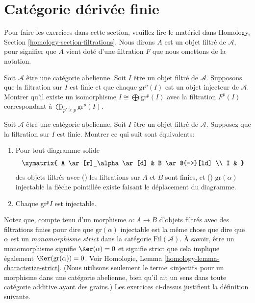 \section{Catégorie dérivée finie}
\label{section-filtered-derived}

\noindent
Pour faire les exercices dans cette section, veuillez lire le
matériel dans Homology, Section \ref{homology-section-filtrations}. Nous dirons $A$ est un
objet filtré de $\mathcal{A}$, pour signifier que $A$ vient doté d'une
filtration $F$ que nous omettons de la notation.

\begin{exercise}
\label{exercise-split-injective}
Soit $\mathcal{A}$ être une catégorie abelienne.
Soit $I$ être un objet filtré de
$\mathcal{A}$. Supposons que la filtration sur
$I$ est finie et que chaque $\text{gr}^p(I)$ est un objet
injecteur de $\mathcal{A}$. Montrer qu'il
existe un isomorphisme $I \cong \bigoplus \text{gr}^p(I)$ avec
la filtration $F^p(I)$ correspondant à $\bigoplus_{p' \geq p} \text{gr}^p(I)$.
\end{exercise}

\begin{exercise}
\label{exercise-filtered-injective}
Soit $\mathcal{A}$ être une catégorie abelienne. Soit
$I$ être un objet filtré de $\mathcal{A}$. Supposez
que la filtration sur $I$ est finie.
Montrer ce qui suit sont équivalents:
\begin{enumerate}
\item Pour tout diagramme solide
$$
\xymatrix{
A \ar[r]_\alpha \ar[d] & B \ar@{-->}[ld] \\
I &
}
$$
des objets filtrés
avec () les filtrations sur $A$ et $B$ sont
finies, et () $\text{gr}(\alpha)$ injectable la flèche
pointillée existe faisant le déplacement du diagramme.
\item Chaque $\text{gr}^p I$ est injectable.
\end{enumerate}
\end{exercise}

\noindent
Notez que, compte tenu d'un morphisme $\alpha : A \to
B$ d'objets filtrés avec des filtrations finies pour dire que
$\text{gr}(\alpha)$ injectable est la même chose que dire que $\alpha$ est
un {\it monomorphisme strict} dans la catégorie
$\text{Fil}(\mathcal{A})$. À savoir, être un monomorphisme signifie $\Ker(\alpha) = 0$
et signifie strict que cela implique également
$\Ker(\text{gr}(\alpha)) = 0$. Voir Homologie, Lemma \ref{homology-lemma-characterize-strict}. (Nous utilisons seulement
le terme «injectif» pour un morphisme dans une catégorie abelienne, bien
qu'il ait un sens dans toute catégorie additive ayant des
grains.) Les exercices ci-dessus justifient la définition suivante.

